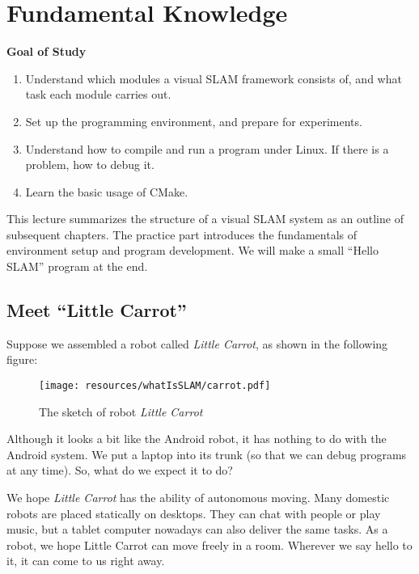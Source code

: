 \chapter{Fundamental Knowledge}
\label{cpt:2}
\begin{mdframed}
	\textbf{Goal of Study}
	\begin{enumerate}[labelindent=0em,leftmargin=1.5em]
		\item Understand which modules a visual SLAM framework consists of, and what task each module carries out.
		\item Set up the programming environment, and prepare for experiments.
		\item Understand how to compile and run a program under Linux. If there is a problem, how to debug it.
		\item Learn the basic usage of CMake.
	\end{enumerate}
\end{mdframed}

This lecture summarizes the structure of a visual SLAM system as an outline of subsequent chapters. The practice part introduces the fundamentals of environment setup and program development. We will make a small ``Hello SLAM'' program at the end.

\newpage

\newpage

\section{Meet ``Little Carrot''}
Suppose we assembled a robot called \emph{Little Carrot}, as shown in the following figure:

\begin{figure}
	\centering
	\texttt{[image: resources/whatIsSLAM/carrot.pdf]}
	\caption{The sketch of robot \emph{Little Carrot}}
\end{figure}

Although it looks a bit like the Android robot, it has nothing to do with the Android system. We put a laptop into its trunk (so that we can debug programs at any time). So, what do we expect it to do? 

We hope \textit{Little Carrot} has the ability of autonomous moving. Many domestic robots are placed statically on desktops. They can chat with people or play music, but a tablet computer nowadays can also deliver the same tasks. As a robot, we hope Little Carrot can move freely in a room. Wherever we say hello to it, it can come to us right away.

